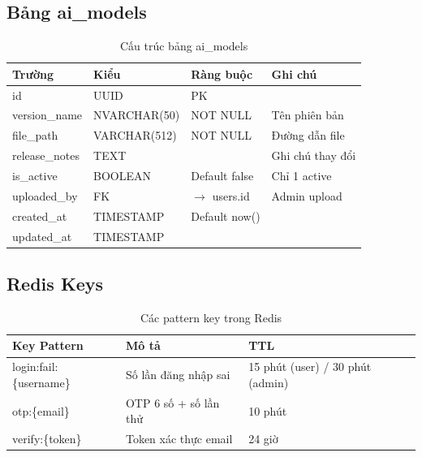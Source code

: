 \documentclass[12pt,a4paper]{article}
\begin{document}
\subsection{Bảng ai\_models}
\begin{longtable}{|l|l|l|p{5.5cm}|}
    \caption{Cấu trúc bảng ai\_models}                                          \\
    \hline
    \rowcolor{headerblue}
    \textbf{Trường} & \textbf{Kiểu} & \textbf{Ràng buộc}     & \textbf{Ghi chú} \\
    \hline
    id              & UUID          & PK                     &                  \\
    \hline
    version\_name   & NVARCHAR(50)  & NOT NULL               & Tên phiên bản    \\
    \hline
    file\_path      & VARCHAR(512)  & NOT NULL               & Đường dẫn file   \\
    \hline
    release\_notes  & TEXT          &                        & Ghi chú thay đổi \\
    \hline
    is\_active      & BOOLEAN       & Default false          & Chỉ 1 active     \\
    \hline
    uploaded\_by    & FK            & $\rightarrow$ users.id & Admin upload     \\
    \hline
    created\_at     & TIMESTAMP     & Default now()          &                  \\
    \hline
    updated\_at     & TIMESTAMP     &                        &                  \\
    \hline
\end{longtable}

\subsection{Redis Keys}
\begin{longtable}{|l|p{7.5cm}|l|}
    \caption{Các pattern key trong Redis}                                              \\
    \hline
    \rowcolor{headerblue}
    \textbf{Key Pattern}    & \textbf{Mô tả}        & \textbf{TTL}                     \\
    \hline
    login:fail:\{username\} & Số lần đăng nhập sai  & 15 phút (user) / 30 phút (admin) \\
    \hline
    otp:\{email\}           & OTP 6 số + số lần thử & 10 phút                          \\
    \hline
    verify:\{token\}        & Token xác thực email  & 24 giờ                           \\
    \hline
\end{longtable}
\end{document}
